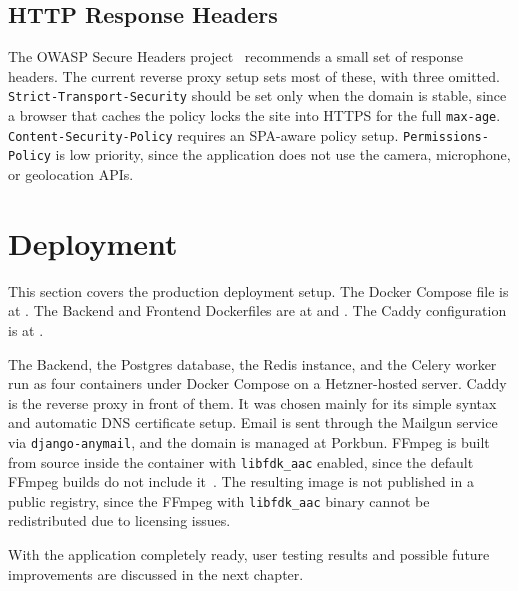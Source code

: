 \subsection{HTTP Response Headers}
The OWASP Secure Headers project~\parencite{owasp_secure_headers} recommends a small set of response
headers. The current reverse proxy setup sets most of these, with
three omitted.
\texttt{Strict-Transport-Security} should be set only when the domain is
stable, since a browser that caches the policy locks the site into
HTTPS for the full \texttt{max-age}.
\texttt{Content-Security-Policy} requires an SPA-aware policy setup.
\texttt{Permissions-Policy} is low priority, since the application does not use the camera,
microphone, or geolocation APIs.


\section{Deployment}
This section covers the production deployment setup.
The Docker Compose file is at .
The Backend and Frontend Dockerfiles are at
 and .
The Caddy configuration is at .

The Backend, the Postgres database, the Redis instance, and the
Celery worker run as four containers under Docker Compose on a
Hetzner-hosted server. Caddy is the reverse proxy in front of them.
It was chosen mainly for its simple syntax and automatic DNS certificate setup.
Email is sent through the Mailgun service via
\texttt{django-anymail}, and the domain is managed at Porkbun.
FFmpeg is built from source inside the container with
\texttt{libfdk\_aac} enabled, since the default FFmpeg builds do not
include it~\parencite{ffmpeg_aac}. The resulting image is not
published in a public registry, since the FFmpeg with
\texttt{libfdk\_aac} binary cannot be redistributed due to
licensing issues.~\parencite{vialicensing_aac}


With the application completely ready, user testing
results and possible future improvements are discussed in the next chapter.